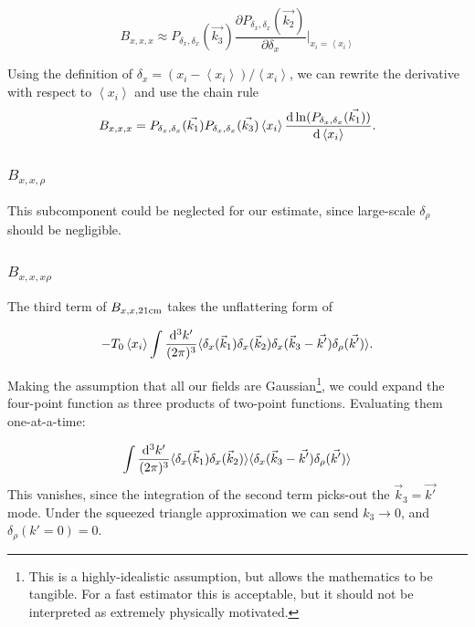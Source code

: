 \begin{equation}
B_{x,x,x} \approx P_{\delta_x,\delta_x}(\vec{k_3}) \frac{\partial P_{\delta_x,\delta_x}(\vec{k_2}) }{\partial\delta_x}|_{x_i = \left\langle x_i \right\rangle}
\end{equation}

Using the definition of $\delta_x = (x_i - \left\langle x_i \right\rangle)/\left\langle x_i \right\rangle$, we can rewrite the derivative with respect to $\left\langle x_i \right\rangle$ and use the chain rule
\begin{equation}
B_{x,x,x} = P_{\delta_x,\delta_x}(\vec{k_1}) P_{\delta_x,\delta_x}(\vec{k_3}) \left\langle x_i \right\rangle \frac{{\rm d} \ln (P_{\delta_x,\delta_x}(\vec{k_1}))}{{\rm d}\left\langle x_i \right\rangle}.
\end{equation}

\subsubsection*{$B_{x,x,\rho}$}
\label{subsubsec:Bxxrho}
This subcomponent could be neglected for our estimate, since large-scale $\delta_{\rho}$ should be negligible.

\subsubsection*{$B_{x,x,x\rho}$}
\label{subsubsec:B_xxxrho}
The third term of $B_{x,x,{\rm 21cm}}$ takes the unflattering form of

\begin{equation}
- T_0 \left\langle x_i \right\rangle \int \frac{{\rm d^3}k'}{(2\pi)^3} 
\langle \delta_x(\vec{k}_1) \delta_x(\vec{k}_2) \delta_x(\vec{k}_3 - \vec{k'})\delta_{\rho}(\vec{k'}) \rangle .
\end{equation}

Making the assumption that all our fields are Gaussian\footnote{This is a highly-idealistic assumption, but allows the mathematics to be tangible. For a fast estimator this is acceptable, but it should not be interpreted as extremely physically motivated.}, we could expand the four-point function as three products of two-point functions. Evaluating them one-at-a-time:

\begin{equation}
\int \frac{{\rm d^3}k'}{(2\pi)^3} \langle \delta_x(\vec{k}_1) \delta_x(\vec{k}_2) \rangle \langle \delta_x(\vec{k}_3 - \vec{k'})\delta_{\rho}(\vec{k'}) \rangle
\end{equation}
This vanishes, since the integration of the second term picks-out the $\vec{k}_3 = \vec{k'}$ mode. Under the squeezed triangle approximation we can send $k_3 \rightarrow 0$, and $\delta_{\rho}(k'=0)=0$.

